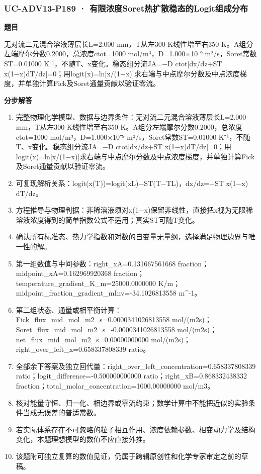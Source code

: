 \documentclass[UTF8,11pt,a4paper]{ctexart}
\begin{document}
\subsubsection*{UC-ADV13-P189 · 有限浓度Soret热扩散稳态的Logit组成分布}
\noindent\textbf{题目}\par
无对流二元混合溶液薄层长L=2.000 mm，T从左300 K线性增至右350 K。A组分左端摩尔分数0.2000，总浓度ctot=1000 mol/m³，D=1.000×10⁻⁹ m²/s，Soret常数ST=0.01000 K⁻¹，不随T、x变化。稳态组分流JA=−D ctot[dx/dz+ST x(1−x)dT/dz]=0；用logit(x)=ln[x/(1−x)]求右端与中点摩尔分数及中点浓度梯度，并单独计算Fick及Soret通量贡献以验证零流。\par
\medskip\noindent\textbf{分步解答}
\begin{enumerate}
\item 完整物理化学模型、数据与边界条件：无对流二元混合溶液薄层长L=2.000 mm，T从左300 K线性增至右350 K。A组分左端摩尔分数0.2000，总浓度ctot=1000 mol/m³，D=1.000×10⁻⁹ m²/s，Soret常数ST=0.01000 K⁻¹，不随T、x变化。稳态组分流JA=−D ctot[dx/dz+ST x(1−x)dT/dz]=0；用logit(x)=ln[x/(1−x)]求右端与中点摩尔分数及中点浓度梯度，并单独计算Fick及Soret通量贡献以验证零流。
\item 可复现解析关系：logit(x(T))=logit(xL)−ST(T−TL)，dx/dz=−ST x(1−x) dT/dz。
\item 方程推导与物理判据：非稀溶液须对x(1−x)保留非线性，直接把x视为无限稀溶液浓度得到的简单指数公式不适用；真实ST可随T变化。
\item 确认所有标准态、热力学指数和对数的自变量无量纲，选择满足物理边界与唯一性的解。
\item 第一组数值与中间参数：right\_xA=0.131667561668 fraction；midpoint\_xA=0.162969920368 fraction；temperature\_gradient\_K\_m=25000.0000000 K/m；midpoint\_fraction\_gradient\_mInv=-34.1026813558 m\textasciicircum{}-1。
\item 第二组状态、通量或相平衡计算：Fick\_flux\_mid\_mol\_m2\_s=0.0000341026813558 mol/(m2s)；Soret\_flux\_mid\_mol\_m2\_s=-0.0000341026813558 mol/(m2s)；net\_flux\_mid\_mol\_m2\_s=0.00000000000 mol/(m2s)；right\_over\_left\_x=0.658337808339 ratio。
\item 全部余下答案及独立回代量：right\_over\_left\_concentration=0.658337808339 ratio；logit\_difference=-0.500000000000 ratio；right\_xB=0.868332438332 fraction；total\_molar\_concentration=1000.00000000 mol/m3。
\item 核对能量守恒、归一化、相边界或零流约束；数学计算中不能把近似的实验条件当成无误差的普适常数。
\item 若实际体系存在不可忽略的粒子相互作用、浓度依赖参数、相变动力学及结构变化，本题理想模型的数值不应直接外推。
\item 该题附可独立复算的数值见证，仍属于跨辑原创性和化学专家审定之前的草稿。
\end{enumerate}
\end{document}
